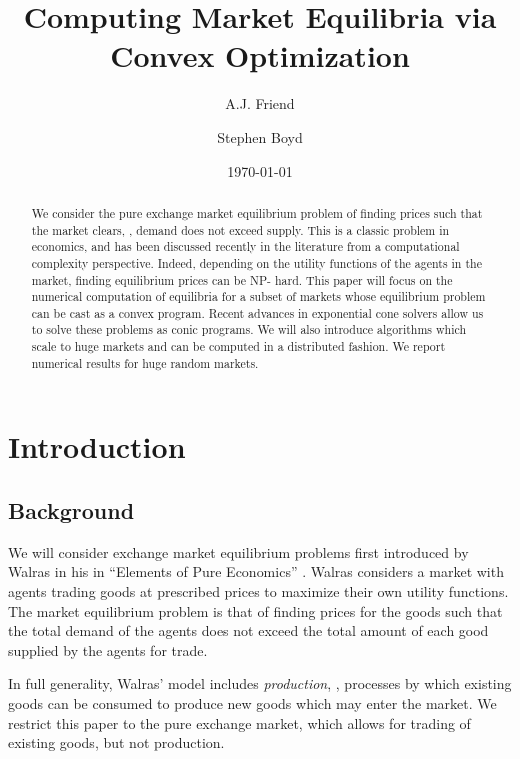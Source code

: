 \documentclass[12pt]{article}
\title{Computing Market Equilibria via Convex Optimization}
\author{A.J. Friend \and Stephen Boyd}
\date{\today}
\begin{document}
\maketitle

\begin{abstract}

We consider the pure exchange market equilibrium problem of finding prices such
that the market clears, \ie, demand does not exceed supply. This is a classic
problem in economics, and has been discussed recently in the literature from a
computational complexity perspective. Indeed, depending on the utility
functions of the agents in the market, finding equilibrium prices can be NP-
hard. This paper will focus on the numerical computation of equilibria for a
subset of markets whose equilibrium problem can be cast as a convex program.
Recent advances in exponential cone solvers allow us to solve these problems as
conic programs. We will also introduce algorithms which scale to huge markets
and can be computed in a distributed fashion. We report numerical results for
huge random markets.

\end{abstract}

\newpage
\tableofcontents
\newpage


\section{Introduction}
\subsection{Background}

We will consider exchange market equilibrium problems first introduced by
Walras in his in ``Elements of Pure Economics'' \cite{walras1896elements}.
Walras considers a market with agents trading goods at prescribed prices to
maximize their own utility functions. The market equilibrium problem is that of
finding prices for the goods such that the total demand of the agents does not
exceed the total amount of each good supplied by the agents for trade.

In full generality, Walras' model includes \emph{production}, \ie, processes by
which existing goods can be consumed to produce new goods which may enter the
market. We restrict this paper to the pure exchange market, which allows for
trading of existing goods, but not production.
\end{document}
